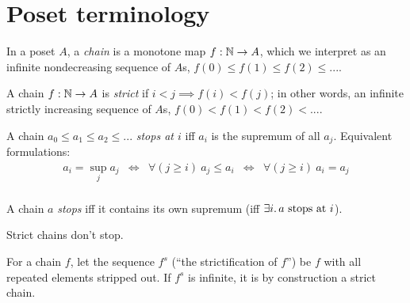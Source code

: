 \documentclass{rntz}
\begin{document}
\section{Poset terminology}

\begin{definition}[Chain]
  In a poset $A$, a \emph{chain} is a monotone map $f : \mathbb{N} \to A$, which we
  interpret as an infinite nondecreasing sequence of $A$s, $f(0) \le f(1) \le
  f(2) \le ...$.
\end{definition}

\begin{definition}
  A chain $f : \mathbb{N} \to A$ is \emph{strict} if $i < j \implies f(i) < f(j)$; in
  other words, an infinite strictly increasing sequence of $A$s, $f(0) < f(1) <
  f(2) < ...$.
\end{definition}

\begin{definition}[Stops at]
  A chain $a_0 \le a_1 \le a_2 \le ...$ \emph{stops at $i$} iff $a_i$ is the
  supremum of all $a_j$. Equivalent formulations:
  \[\begin{array}{ccccc}
    a_i = \sup_j a_j
    &\Leftrightarrow& \forall(j \ge i)\ a_j \le a_i
    &\Leftrightarrow& \forall(j \ge i)\ a_i = a_j\\
  \end{array}\]
\end{definition}

\begin{definition}[Stops]
  A chain $a$ \emph{stops} iff it contains its own supremum (iff $\exists
  i.\, a~\text{stops at}~i$).
\end{definition}

\begin{observation} Strict chains don't stop. \end{observation}

\begin{definition}
  For a chain $f$, let the sequence $f^s$ (``the strictification of $f$'') be
  $f$ with all repeated elements stripped out. If $f^s$ is infinite, it is by
  construction a strict chain.
\end{definition}

\end{document}
